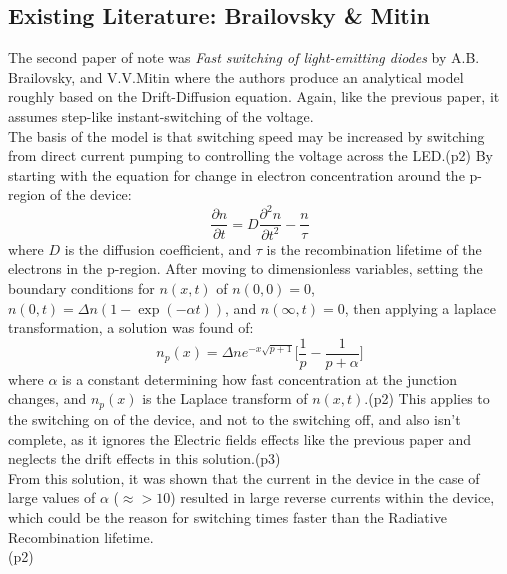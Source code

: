 \documentclass[titlepage]{article}
\begin{document}
\subsection{Existing Literature: Brailovsky \& Mitin}
The second paper of note was \textit{Fast switching of light-emitting diodes} by A.B. Brailovsky, and V.V.Mitin\cite{Brailovsky} where the authors produce an analytical model roughly based on the Drift-Diffusion equation. Again, like the previous paper, it assumes step-like instant-switching of the voltage.\\
The basis of the model is that switching speed may be increased by switching from direct current pumping to controlling the voltage  across the LED.\cite{Brailovsky}(p2) By starting with the equation for change in electron concentration around the p-region of the device:
\begin{equation}
\dfrac{\partial n}{\partial t} = D \dfrac{\partial^2n}{\partial t^2} - \frac{n}{\tau}
\end{equation}
where $D$ is the diffusion coefficient, and $\tau$ is the recombination lifetime of the electrons in the p-region. After moving to dimensionless variables, setting the boundary conditions for $n(x,t)$ of $n(0,0) = 0$, $n(0,t) = \Delta n(1-\exp(-\alpha t))$, and $n(\infty,t) = 0$, then applying a laplace transformation, a solution was found of:
\begin{equation}
n_p(x) = \Delta n e^{-x\sqrt{p+1}}\Big[\frac{1}{p}-\frac{1}{p+\alpha}\Big]
\end{equation}
where $\alpha$ is a constant determining how fast concentration at the junction changes, and $n_p(x)$ is the Laplace transform of $n(x,t)$.\cite{Brailovsky}(p2) This applies to the switching on of the device, and not to the switching off, and also isn't complete, as it ignores the Electric fields effects like the previous paper and neglects the drift effects in this solution.\cite{Brailovsky}(p3) \\
From this solution, it was shown that the current in the device in the case of large values of $\alpha$ ($\approx>10$) resulted in large reverse currents within the device, which could be the reason for switching times faster than the Radiative Recombination lifetime.\\\cite{Brailovsky}(p2)
\end{document}
